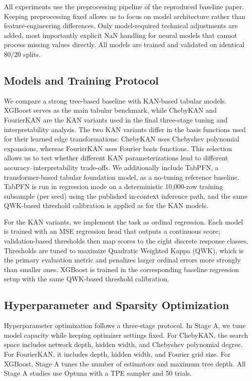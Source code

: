 \documentclass{article}
\begin{document}
All experiments use the preprocessing pipeline of the reproduced baseline paper. Keeping preprocessing fixed allows us to focus on model architecture rather than feature-engineering differences. Only model-required technical adjustments are added, most importantly explicit NaN handling for neural models that cannot process missing values directly. All models are trained and validated on identical 80/20 splits.

\subsection{Models and Training Protocol}

We compare a strong tree-based baseline with KAN-based tabular models. XGBoost serves as the main tabular benchmark, while ChebyKAN and FourierKAN are the KAN variants used in the final three-stage tuning and interpretability analysis. The two KAN variants differ in the basis functions used for their learned edge transformations: ChebyKAN uses Chebyshev polynomial expansions, whereas FourierKAN uses Fourier basis functions. This selection allows us to test whether different KAN parameterizations lead to different accuracy--interpretability trade-offs. We additionally include TabPFN, a transformer-based tabular foundation model, as a no-tuning reference baseline. TabPFN is run in regression mode on a deterministic 10{,}000-row training subsample (per seed) using the published in-context inference path, and the same QWK-based threshold calibration is applied as for the KAN models.

For the KAN variants, we implement the task as ordinal regression. Each model is trained with an MSE regression head that outputs a continuous score; validation-based thresholds then map scores to the eight discrete response classes. Thresholds are tuned to maximize Quadratic Weighted Kappa (QWK), which is the primary evaluation metric and penalizes larger ordinal errors more strongly than smaller ones. XGBoost is trained in the corresponding baseline regression setup with the same QWK-based threshold calibration.

\subsection{Hyperparameter and Sparsity Optimization}

Hyperparameter optimization follows a three-stage protocol. In Stage A, we tune model capacity while keeping optimizer settings fixed. For ChebyKAN, the search space includes network depth, hidden width, and Chebyshev polynomial degree. For FourierKAN, it includes depth, hidden width, and Fourier grid size. For XGBoost, Stage A tunes the number of estimators and maximum tree depth. All Stage A studies use Optuna with a TPE sampler and 50 trials.
\end{document}
